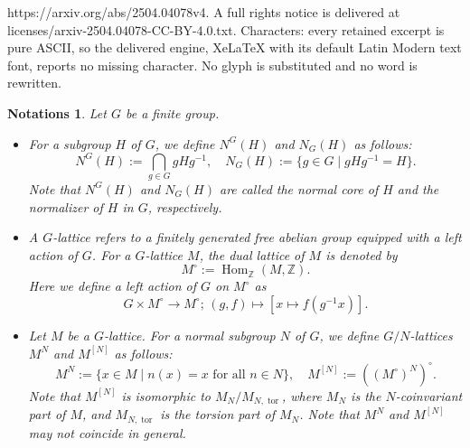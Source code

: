 \documentclass[10pt,a4paper]{amsart}
\newtheorem*{nota}{Notations}
\newcommand{\Z}{\mathbb{Z}}
\DeclareMathOperator{\Hom}{Hom}
\DeclareMathOperator{\tor}{tor}
\begin{document}
https://arxiv.org/abs/2504.04078v4. A full rights notice is delivered at licenses/arxiv-2504.04078-CC-BY-4.0.txt. Characters: every retained excerpt is pure ASCII, so the delivered engine, XeLaTeX with its default Latin Modern text font, reports no missing character. No glyph is substituted and no word is rewritten.
\begin{nota}
Let $G$ be a finite group. 
\begin{itemize}
\item For a subgroup $H$ of $G$, we define $N^{G}(H)$ and $N_{G}(H)$ as follows: 
\begin{equation*}
N^{G}(H):=\bigcap_{g\in G}gHg^{-1},\quad
N_{G}(H):=\{g\in G\mid gHg^{-1}=H\}. 
\end{equation*}
Note that $N^{G}(H)$ and $N_{G}(H)$ are called the \emph{normal core} of $H$ and the \emph{normalizer} of $H$ in $G$, respectively. 
\item A \emph{$G$-lattice} refers to a finitely generated free abelian group equipped with a left action of $G$. For a $G$-lattice $M$, the dual lattice of $M$ is denoted by
\begin{equation*}
    M^{\circ}:=\Hom_{\Z}(M,\Z). 
\end{equation*}
Here we define a left action of $G$ on $M^{\circ}$ as
\begin{equation*}
    G\times M^{\circ} \rightarrow M^{\circ};\,(g,f)\mapsto [x\mapsto f(g^{-1}x)]. 
\end{equation*}
\item Let $M$ be a $G$-lattice. For a normal subgroup $N$ of $G$, we define $G/N$-lattices $M^{N}$ and $M^{[N]}$ as follows: 
\begin{equation*}
M^{N}:=\{x\in M\mid n(x)=x\text{ for all }n\in N\},\quad 
M^{[N]}:=\left((M^{\circ})^{N}\right)^{\circ}. 
\end{equation*}
Note that $M^{[N]}$ is isomorphic to $M_{N}/M_{N,\tor}$, where $M_{N}$ is the $N$-coinvariant part of $M$, and $M_{N,\tor}$ is the torsion part of $M_{N}$. Note that $M^{N}$ and $M^{[N]}$ may not coincide in general. 
\end{itemize}
\end{nota}
\end{document}
